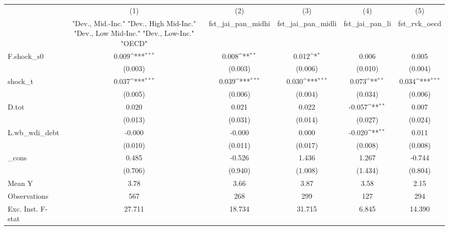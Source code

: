 {
\def\sym#1{\ifmmode^{#1}\else\(^{#1}\)\fi}
\begin{tabular}{l*{5}{c}}
\toprule
            &\multicolumn{1}{c}{(1)}&\multicolumn{1}{c}{(2)}&\multicolumn{1}{c}{(3)}&\multicolumn{1}{c}{(4)}&\multicolumn{1}{c}{(5)}\\
            &\multicolumn{1}{c}{ "Dev., Mid.-Inc." "Dev., High Mid-Inc." "Dev., Low Mid-Inc." "Dev., Low-Inc." "OECD" }&\multicolumn{1}{c}{fst\_jai\_pan\_midhi}&\multicolumn{1}{c}{fst\_jai\_pan\_midli}&\multicolumn{1}{c}{fst\_jai\_pan\_li}&\multicolumn{1}{c}{fst\_rvk\_oecd}\\
\midrule
F.shock\_s0  &       0.009\sym{***}&       0.008\sym{**} &       0.012\sym{*}  &       0.006         &       0.005         \\
            &     (0.003)         &     (0.003)         &     (0.006)         &     (0.010)         &     (0.004)         \\
\addlinespace
shock\_t     &       0.037\sym{***}&       0.039\sym{***}&       0.030\sym{***}&       0.073\sym{**} &       0.034\sym{***}\\
            &     (0.005)         &     (0.006)         &     (0.004)         &     (0.034)         &     (0.006)         \\
\addlinespace
D.tot       &       0.020         &       0.021         &       0.022         &      -0.057\sym{**} &       0.007         \\
            &     (0.013)         &     (0.031)         &     (0.014)         &     (0.027)         &     (0.024)         \\
\addlinespace
L.wb\_wdi\_debt&      -0.000         &      -0.000         &       0.000         &      -0.020\sym{**} &       0.011         \\
            &     (0.010)         &     (0.011)         &     (0.017)         &     (0.008)         &     (0.008)         \\
\addlinespace
\_cons      &       0.485         &      -0.526         &       1.436         &       1.267         &      -0.744         \\
            &     (0.706)         &     (0.940)         &     (1.008)         &     (1.434)         &     (0.804)         \\
\midrule
Mean Y      &        3.78         &        3.66         &        3.87         &        3.58         &        2.15         \\
Observations&         567         &         268         &         299         &         127         &         294         \\
Exc. Inst. F-stat&      27.711         &      18.734         &      31.715         &       6.845         &      14.390         \\
\bottomrule
\end{tabular}
}
